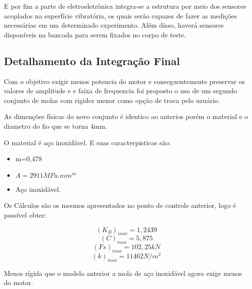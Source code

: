   E por fim a parte de eletroeletrônica integra-se a estrutura por meio dos sensores acoplados na superfície vibratória, os quais serão capazes de fazer as medições necessárias em um determinado experimento. Além disso, haverá sensores disponíveis na bancada para serem fixados no corpo de teste.

\subsection{Detalhamento da Integração Final}

Com o objetivo exigir menos potencia do motor e conseguentemente preservar os valores de amplitude e e faixa de frequencia foi proposto o uso de um segundo conjunto de molas com rigidez menor como opção de troca pelo uzuário.

As dimenções físicas do novo conjunto é identico ao anterios porém o material e o diametro do fio que se torna 4mm.

O material é aço inoxidável. E suas caracterpisticas são:

\begin{itemize}
\item m=0,478
\item $A=2911 MPa.mm^m$
\item Aço inoxidável.
\end{itemize}

Os Cálculos são os mesmos apresentados no ponto de controle anterior, logo é possível obter:

$$(K_B)_{inox}=1,2439$$
$$(C)_{inox}=5,875 $$
$$(Fs)_{inox}=102,25kN $$
$$(k)_{inox}=11462 N/m^2$$

Menos rígida que o modelo anterior a mola de aço inoxidável agora exige menos do motor.





